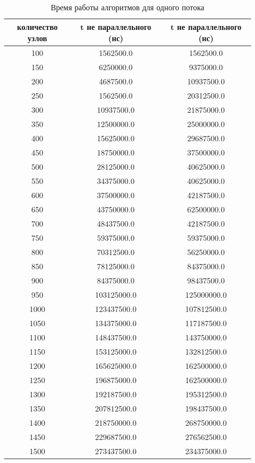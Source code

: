 \begin{table}[H]
  \begin{center}
    \captionsetup{justification=raggedright}
     \caption{Время работы алгоритмов для одного потока}
    \label{tab:thr_1}
    \begin{tabular}{|c|c|c|}
      \hline	
      \textbf{количество узлов} & \textbf{t не параллельного (нс)}  & \textbf{t не параллельного (нс)}\\
      \hline	
	100 & 1562500.0 & 1562500.0\\
	150 & 6250000.0 & 9375000.0\\     
	200 & 4687500.0 & 10937500.0\\    
	250 & 1562500.0 & 20312500.0\\    
	300 & 10937500.0 & 21875000.0\\   
	350 & 12500000.0 & 25000000.0\\   
	400 & 15625000.0 & 29687500.0\\   
	450 & 18750000.0 & 37500000.0\\   
	500 & 28125000.0 & 40625000.0\\   
	550 & 34375000.0 & 40625000.0\\   
	600 & 37500000.0 & 42187500.0\\   
	650 & 43750000.0 & 62500000.0\\   
	700 & 48437500.0 & 42187500.0\\   
	750 & 59375000.0 & 59375000.0\\   
	800 & 70312500.0 & 56250000.0\\   
	850 & 78125000.0 & 84375000.0\\   
	900 & 84375000.0 & 98437500.0\\   
	950 & 103125000.0 & 125000000.0\\ 
	1000 & 123437500.0 & 107812500.0\\
	1050 & 134375000.0 & 117187500.0\\
	1100 & 148437500.0 & 143750000.0\\
	1150 & 153125000.0 & 132812500.0\\
	1200 & 165625000.0 & 162500000.0\\
	1250 & 196875000.0 & 162500000.0\\
	1300 & 192187500.0 & 195312500.0\\
	1350 & 207812500.0 & 198437500.0\\
	1400 & 218750000.0 & 268750000.0\\
	1450 & 229687500.0 & 276562500.0\\
	1500 & 273437500.0 & 234375000.0\\
      \hline	
    \end{tabular}
  \end{center}
\end{table}

